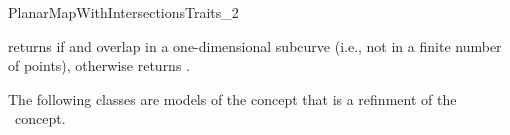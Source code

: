 \begin{ccRefConcept}{PlanarMapWithIntersectionsTraits_2}

{returns  if  and  overlap
in a one-dimensional subcurve (i.e., not in a finite number
of points), otherwise returns
.}

\ccHasModels
The following classes are models of the 
 concept that is a refinment of the \ccRefName\
concept. 

  \\
  \\
  \\

\end{ccRefConcept}

\ccRefPageEnd
